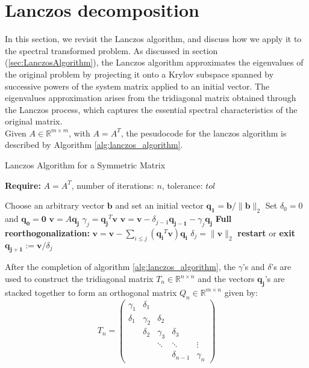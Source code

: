 \section{Lanczos decomposition}\label{sec:LanczosDecomposition}
In this section, we revisit the Lanczos algorithm, and discuss how we apply it to the spectral transformed problem. As discussed in section (\ref{sec:LanczosAlgorithm}), the Lanczos algorithm approximates the eigenvalues of the original problem by projecting it onto a Krylov subspace spanned by successive powers of the system matrix applied to an initial vector. The eigenvalues approximation arises from the tridiagonal matrix obtained through the Lanczos process, which captures the essential spectral characteristics of the original matrix.\\
Given $A \in \mathbb{R}^{m \times m}$, with $A=A^T$, the pesudocode for the lanczos algorithm is described by Algorithm \ref{alg:lanczos_algorithm}.
\begin{algorithm}
	\caption{Lanczos Algorithm for a Symmetric Matrix}
	\label{alg:lanczos_algorithm}

	\textbf{Require:} \( A = A^T \), number of iterations: \(n\), tolerance: \(tol\)
	\begin{algorithmic}[1]
		\State Choose an arbitrary vector $\mathbf{b}$ and set an initial vector $\mathbf{q_1} = \mathbf{b}/ \|\mathbf{b}\|_2$ 
		\State Set $\delta_0 = 0$ and $\mathbf{q_0} = \mathbf{0}$
		\State $\mathbf{v} = A \mathbf{q_j}$
		\State $\gamma_j = \mathbf{q_j}^T \mathbf{v} $
		\State $\mathbf{v} = \mathbf{v} - \delta_{j-1}\mathbf{q_{j-1}} - \gamma_j \mathbf{q_j}$
		\State \textbf{Full reorthogonalization:} $\mathbf{v} = \mathbf{v} - \sum_{i \leq j} (\mathbf{q_i}^T \mathbf{v}) \mathbf{q_i}$
		\State $\delta_{j} = \|\mathbf{v}\|_2$
		\State \textbf{restart} or \textbf{exit}
		\EndIf
		\State $\mathbf{q_{j+1}} := \mathbf{v} / \delta_{j}$
		\EndFor
		\EndFunction
	\end{algorithmic}
\end{algorithm}
After the completion of algorithm \ref{alg:lanczos_algorithm}, the $\gamma$'s and $\delta$'s are used to construct the tridiagonal matrix $T_n \in \mathbb{R}^{n \times n}$ and the vectors $\mathbf{q_j}$'s are stacked together to form an orthogonal matrix $Q_n \in \mathbb{R}^{m \times n}$ given by:
\[T_n = \begin{pmatrix}
			\gamma_1 & \delta_1 & & & \\\delta_1 & \gamma_2 & \delta_2 & & \\ & \delta_2 & \gamma_3 & \delta_3 & \\ & & \ddots & \ddots & \vdots \\ & & & \delta_{n-1} & \gamma_n
		\end{pmatrix}\] 
